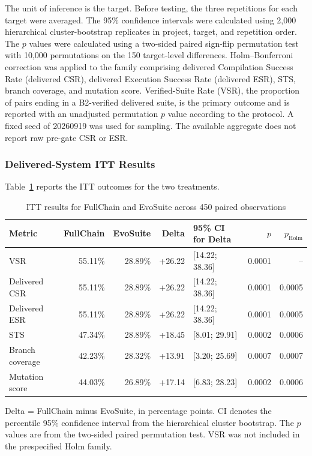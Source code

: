 \documentclass[pdflatex,sn-basic,Numbered,iicol]{sn-jnl}
\begin{document}
The unit of inference is the target. Before testing, the three repetitions for each target were averaged. The 95\% confidence intervals were calculated using 2,000 hierarchical cluster-bootstrap replicates in project, target, and repetition order. The $p$ values were calculated using a two-sided paired sign-flip permutation test with 10,000 permutations on the 150 target-level differences. Holm--Bonferroni correction was applied to the family comprising delivered Compilation Success Rate (delivered CSR), delivered Execution Success Rate (delivered ESR), STS, branch coverage, and mutation score. Verified-Suite Rate (VSR), the proportion of pairs ending in a B2-verified delivered suite, is the primary outcome and is reported with an unadjusted permutation $p$ value according to the protocol. A fixed seed of 20260919 was used for sampling. The available aggregate does not report raw pre-gate CSR or ESR.

\subsubsection{Delivered-System ITT Results}\label{subsubsec:fullchain-itt}

Table~\ref{tab:fullchain-itt} reports the ITT outcomes for the two treatments.

\begin{table}[htbp]
\caption{ITT results for FullChain and EvoSuite across 450 paired observations}\label{tab:fullchain-itt}
\centering
\scriptsize
\begin{tabularx}{\textwidth}{@{}>{\raggedright\arraybackslash}X r r r l r r@{}}
\toprule
Metric & FullChain & EvoSuite & Delta & 95\% CI for Delta & $p$ & $p_{\mathrm{Holm}}$ \\
\midrule
VSR & 55.11\% & 28.89\% & +26.22 & [14.22; 38.36] & 0.0001 & -- \\
Delivered CSR & 55.11\% & 28.89\% & +26.22 & [14.22; 38.36] & 0.0001 & 0.0005 \\
Delivered ESR & 55.11\% & 28.89\% & +26.22 & [14.22; 38.36] & 0.0001 & 0.0005 \\
STS & 47.34\% & 28.89\% & +18.45 & [8.01; 29.91] & 0.0002 & 0.0006 \\
Branch coverage & 42.23\% & 28.32\% & +13.91 & [3.20; 25.69] & 0.0007 & 0.0007 \\
Mutation score & 44.03\% & 26.89\% & +17.14 & [6.83; 28.23] & 0.0002 & 0.0006 \\
\bottomrule
\end{tabularx}
\begin{tablenotes}
\item Delta = FullChain minus EvoSuite, in percentage points. CI denotes the percentile 95\% confidence interval from the hierarchical cluster bootstrap. The $p$ values are from the two-sided paired permutation test. VSR was not included in the prespecified Holm family.
\end{tablenotes}
\end{table}
\end{document}

